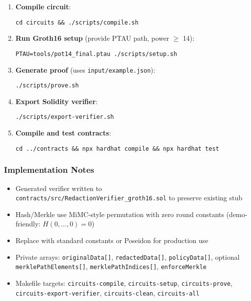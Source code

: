 \begin{enumerate}
    \item \textbf{Compile circuit}:
    \begin{verbatim}
cd circuits && ./scripts/compile.sh
    \end{verbatim}
    
    \item \textbf{Run Groth16 setup} (provide PTAU path, power $\geq$ 14):
    \begin{verbatim}
PTAU=tools/pot14_final.ptau ./scripts/setup.sh
    \end{verbatim}
    
    \item \textbf{Generate proof} (uses \texttt{input/example.json}):
    \begin{verbatim}
./scripts/prove.sh
    \end{verbatim}
    
    \item \textbf{Export Solidity verifier}:
    \begin{verbatim}
./scripts/export-verifier.sh
    \end{verbatim}
    
    \item \textbf{Compile and test contracts}:
    \begin{verbatim}
cd ../contracts && npx hardhat compile && npx hardhat test
    \end{verbatim}
\end{enumerate}

\subsubsection{Implementation Notes}

\begin{itemize}
    \item Generated verifier written to \texttt{contracts/src/RedactionVerifier\_groth16.sol} to preserve existing stub
    \item Hash/Merkle use MiMC-style permutation with zero round constants (demo-friendly: $H(0,\ldots,0)=0$)
    \item Replace with standard constants or Poseidon for production use
    \item Private arrays: \texttt{originalData[]}, \texttt{redactedData[]}, \texttt{policyData[]}, optional \texttt{merklePathElements[]}, \texttt{merklePathIndices[]}, \texttt{enforceMerkle}
    \item Makefile targets: \texttt{circuits-compile}, \texttt{circuits-setup}, \texttt{circuits-prove}, \texttt{circuits-export-verifier}, \texttt{circuits-clean}, \texttt{circuits-all}
\end{itemize}


